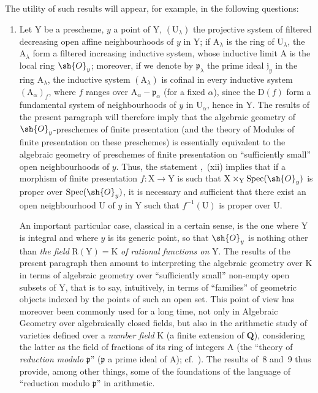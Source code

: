 \begin{env}[8.1.2]
\label{IV.8.1.2}
The utility of such results will appear, for example, in the following questions:
\begin{enumerate}[label=\emph{\alph*)}]
  \item
  Let $\mathrm{Y}$ be a prescheme, $y$ a point of $\mathrm{Y}$, $(\mathrm{U}_\lambda)$ the projective system of filtered decreasing open affine neighbourhoods of $y$ in $\mathrm{Y}$; if $\mathrm{A}_\lambda$ is the ring of $\mathrm{U}_\lambda$, the $\mathrm{A}_\lambda$ form a filtered increasing inductive system, whose inductive limit $\mathrm{A}$ is the local ring $\sh{O}_y$; moreover, if we denote by $\mathfrak{p}_\lambda$ the prime ideal $\mathfrak{j}_y$ in the ring $\mathrm{A}_\lambda$, the inductive system $(\mathrm{A}_\lambda)$ is cofinal in every inductive system $(\mathrm{A}_\alpha)_f$, where $f$ ranges over $\mathrm{A}_\alpha-\mathfrak{p}_\alpha$
(for a fixed $\alpha$), since the $\mathrm{D}(f)$ form a fundamental system of neighbourhoods of $y$ in $\mathrm{U}_\alpha$, hence in $\mathrm{Y}$.
The results of the present paragraph will therefore imply that the algebraic geometry of $\sh{O}_y$-preschemes of finite presentation (and the theory of Modules of finite presentation on these preschemes) is essentially equivalent to the algebraic geometry of preschemes of finite presentation on ``sufficiently small'' open neighbourhoods of $y$.
Thus, the statement ,~(xii) implies that if a morphism of finite presentation $f:\mathrm{X}\to\mathrm{Y}$ is such that $\mathrm{X}\times_\mathrm{Y}\operatorname{Spec}(\sh{O}_y)$ is proper over $\operatorname{Spec}(\sh{O}_y)$, it is necessary and sufficient that there exist an open neighbourhood $\mathrm{U}$ of $y$ in $\mathrm{Y}$ such that $f^{-1}(\mathrm{U})$ is proper over $\mathrm{U}$.

An important particular case, classical in a certain sense, is the one where $\mathrm{Y}$ is integral and where $y$ is its generic point, so that $\sh{O}_y$ is nothing other than \emph{the field} $\mathrm{R}(\mathrm{Y})=\mathrm{K}$ \emph{of rational functions on} $\mathrm{Y}$.
The results of the present paragraph then amount to interpreting the algebraic geometry over $\mathrm{K}$ in terms of algebraic geometry over ``sufficiently small'' non-empty open subsets of $\mathrm{Y}$, that is to say, intuitively, in terms of ``families'' of geometric objects indexed by the points of such an open set.
This point of view has moreover been commonly used for a long time, not only in Algebraic Geometry over algebraically closed fields, but also in the arithmetic study of varieties defined over a \emph{number field} $\mathrm{K}$ (a finite extension of $\mathbf{Q}$), considering the latter as the field of fractions of its ring of integers $\mathrm{A}$ (the ``theory of \emph{reduction modulo} $\mathfrak{p}$'' ($\mathfrak{p}$ a prime ideal of $\mathrm{A}$); cf.\ ).
The results of \textsection\textsection\,8 and~9 thus provide, among other things, some of the foundations of the language of ``reduction modulo $\mathfrak{p}$'' in arithmetic.


\end{enumerate}
\end{env}
